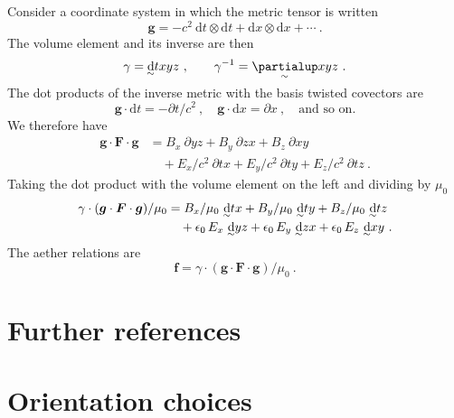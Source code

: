 \documentclass[\ifafour a4paper,12pt,\else a5paper,10pt,\fi%
onecolumn,oneside,article,%
british%
]{memoir}
\theoremstyle{remark}
\theoremstyle{innote}
\newcommand*{\de}{\partialup}%
\newcommand*{\di}{\mathrm{d}}%
\renewcommand*{\|}[1][]{\nonscript\:#1\vert\nonscript\:\mathopen{}}
\newcommand*{\sect}{\S}%
\newcommand*{\tw}[2][\scriptstyle\sim]{\smash[b]{\underset{\mathclap{{}^{#1}}}{#2}}}
\newcommand*{\ti}[1][\scriptstyle\sim]{\tw[#1]{\di}}
\newcommand*{\te}[1][\scriptstyle\sim]{\tw[#1]{\de}}
\begin{document}
Consider a coordinate system in which the metric tensor is written
\begin{equation}
  \label{eq:metric}
  \bm{g} = -c^{2}\ \di t\otimes\di t + \di x\otimes\di x + \dotsb\ .
\end{equation}
The volume element \autocites[\sect~9.2]{portamana2019c_r2021} and its inverse are then
\begin{equation}
  \label{eq:vol_element}
  \gamma = \ti txyz \ , \qquad \gamma^{-1} = \te xyz \ .
\end{equation}
The dot products of the inverse metric with the basis twisted covectors are
\begin{equation}
  \label{eq:raised_covectors}
  \bm{g}\cdot\di t = -\de t/c^{2} \ ,\quad
  \bm{g}\cdot\di x = \de x \ ,\quad
  \text{and so on}.
\end{equation}
We therefore have
\begin{equation}
  \label{eq:raise_F}
  \begin{split}
  \bm{g}\cdot\bm{F}\cdot\bm{g} &=
    B_{x}\ \de yz + B_{y}\ \de zx + B_{z}\ \de xy \\
  &\quad+ E_{x}/c^{2}\ \de tx + E_{y}/c^{2}\ \de ty + E_{z}/c^{2}\ \de tz \ .
\end{split}
\end{equation}
Taking the dot product with the volume element on the left and dividing by $\mu_{0}$
\begin{equation}
  \label{eq:raise_F_vol}
  \begin{split}
  \gamma \cdot (\bm{g}\cdot\bm{F}\cdot\bm{g})/\mu_{0} &= 
    B_{x}/\mu_{0}\ \ti tx + B_{y}/\mu_{0}\ \ti ty + B_{z}/\mu_{0}\ \ti tz\\
  &\quad+ \epsilon_0\,E_{x}\ \ti yz + \epsilon_0\,E_{y}\ \ti zx + \epsilon_0\,E_{z}\ \ti xy \ .
\end{split}
\end{equation}
The aether relations are
\begin{equation}
  \label{eq:aether_rel}
  \bm{f} = \gamma \cdot (\bm{g}\cdot\bm{F}\cdot\bm{g})/\mu_{0} \ .
\end{equation}


\section{Further references}
\label{sec:refs}




\iffalse
\section{Orientation choices}
\label{sec:orientation_choices}
\end{document}
